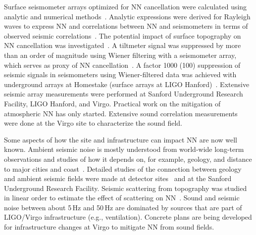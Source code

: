 Surface seismometer arrays optimized for NN cancellation were calculated using analytic and numerical methods~\cite{Har2015,CoEA2016a}. Analytic expressions were derived for Rayleigh waves to express NN and correlations between NN and seismometers in terms of observed seismic correlations~\cite{Har2015,CoEA2016a}. The potential impact of surface topography on NN cancellation was investigated~\cite{CoHa2012}. A tiltmeter signal was suppressed by more than an order of magnitude using Wiener filtering with a seismometer array, which serves as proxy of NN cancellation~\cite{HaVe2016,CoEA2018}. A factor 1000 (100) suppression of seismic signals in seismometers using Wiener-filtered data was achieved with underground arrays at Homestake (surface arrays at LIGO Hanford)~\cite{CoEA2014,CoEA2018}. Extensive seismic array measurements were performed at Sanford Underground Research Facility, LIGO Hanford, and Virgo. Practical work on the mitigation of atmospheric NN has only started. Extensive sound correlation measurements were done at the Virgo site to characterize the sound field.

Some aspects of how the site and infrastructure can impact NN are now well known. 
Ambient seismic noise is mostly understood from world-wide long-term observations and studies of how it depends on, for example, geology, and distance to major cities and coast~\cite{CoHa2012b}. Detailed studies of the connection between geology and ambient seismic fields were made at detector sites~\cite{HaOR2011} and at the Sanford Underground Research Facility. Seismic scattering from topography was studied in linear order to estimate the effect of scattering on NN~\cite{CoHa2012}. Sound and seismic noise between about 5\,Hz and 50\,Hz are dominated by sources that are part of LIGO/Virgo infrastructure (e.g., ventilation). Concrete plans are being developed for infrastructure changes at Virgo to mitigate NN from sound fields.

